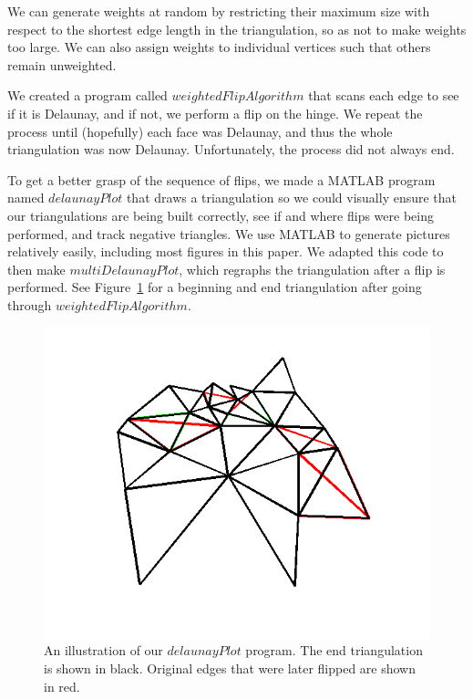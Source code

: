 \documentclass[12pt]{article}
\begin{document}
\noindent We can generate weights at random by restricting their maximum size with respect to the shortest edge length in the triangulation, so as not to make weights too large. We can also assign weights to individual vertices such that others remain unweighted. \newline

\noindent We created a program called $weightedFlipAlgorithm$ that scans each edge to see if it is Delaunay, and if not, we perform a flip on the hinge. We repeat the process until (hopefully) each face was Delaunay, and thus the whole triangulation was now Delaunay. Unfortunately, the process did not always end. \newline

\noindent To get a better grasp of the sequence of flips, we made a MATLAB program named $delaunayPlot$ that draws a triangulation so we could visually ensure that our triangulations are being built correctly, see if and where flips were being performed, and track negative triangles. We use MATLAB to generate pictures relatively easily, including most figures in this paper. We adapted this code to then make $multiDelaunayPlot$, which regraphs the triangulation after a flip is performed. See Figure~\ref{genTri5} for a beginning and end triangulation after going through $weightedFlipAlgorithm$. \newline

\begin{figure}
\centering
\includegraphics[scale = 0.7]{Pictures/genTri5v2.png}
\caption{An illustration of our $delaunayPlot$ program. The end triangulation is shown in black. Original edges that were later flipped are shown in red.}
\label{genTri5}
\end{figure}
\end{document}
